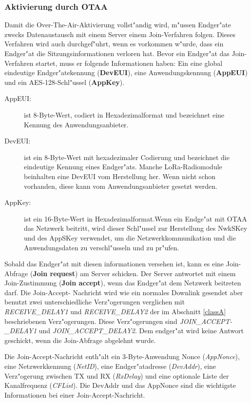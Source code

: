 \subsubsection{Aktivierung durch OTAA}
Damit die Over-The-Air-Aktivierung vollst"andig wird, m"ussen Endger"ate 
zwecks Datenaustausch mit einem Server einem Join-Verfahren folgen. 
Dieses Verfahren wird auch durchgef"uhrt, wenn es vorkommen w"urde, dass 
ein Endger"at die Sitzungsinformationen verloren hat.
Bevor ein Endger"at das Join-Verfahren startet, muss er folgende 
Informationen haben: Ein eine global eindeutige Endger"atekennung 
(\textbf{DevEUI}), eine Anwendungskennung (\textbf{AppEUI}) und ein 
AES-128-Schl"ussel (\textbf{AppKey}). 


\begin{description}
	\item[AppEUI:] ist 8-Byte-Wert, codiert in Hexadezimalformat und 
	bezeichnet eine Kennung des Anwendungsanbieter.
	\item[DevEUI:] ist ein 8-Byte-Wert mit hexadezimaler Codierung und 
	bezeichnet die eindeutige Kennung eines Endger"ats. Manche 
	LoRa-Radiomodule beinhalten eine DevEUI vom Herstellung her. Wenn 
	nicht schon vorhanden, diese kann vom Anwendungsanbieter gesetzt 
	werden.
	\item[AppKey:] ist ein 16-Byte-Wert in Hexadezimalformat.Wenn ein 
	Endge"at mit OTAA das Netzwerk beitritt, wird dieser Schl"ussel zur 
	Herstellung des NwkSKey und des AppSKey verwendet, um die 
	Netzwerkkommunikation und die Anwendungsdaten zu verschl"usseln und 
	zu pr"ufen. 
\end{description}

Sobald das Endger"at mit diesen informationen versehen ist, kann es eine 
Join-Abfrage (\textbf{Join request}) am Server schicken. Der Server 
antwortet mit einem Join-Zustimmung (\textbf{Join accept}), wenn das 
Endger"at dem Netzwerk beitreten darf. Die Join-Accept- Nachricht wird 
wie ein normales Downlink gesendet aber benutzt zwei unterschiedliche 
Verz"ogerungen verglichen mit \textit{RECEIVE\_DELAY1} und 
\textit{RECEIVE\_DELAY2} der im Abschnitt \ref{classA} beschriebenen 
Verz"ogerungen. Diese Verz"ogerungen sind \textit{JOIN\_ACCEPT-\_DELAY1} 
und \textit{JOIN\_ACCEPT\_DELAY2}. Dem endger"at wird keine Antwort 
geschickt, wenn die Join-Abfrage abgelehnt wurde.

Die Join-Accept-Nachricht enth"alt ein 3-Byte-Anwendung Nonce 
(\textit{AppNonce}), eine Netzwerkkennung (\textit{NetID}), eine 
Endger"atadresse (\textit{DevAddr}), eine Verz"ogerung zwischen TX und 
RX (\textit{RxDelay}) und eine optionale Liste der Kanalfrequenz 
(\textit{CFList}). Die DevAddr und das AppNonce sind die wichtigste 
Informationen bei einer Join-Accept-Nachricht.

